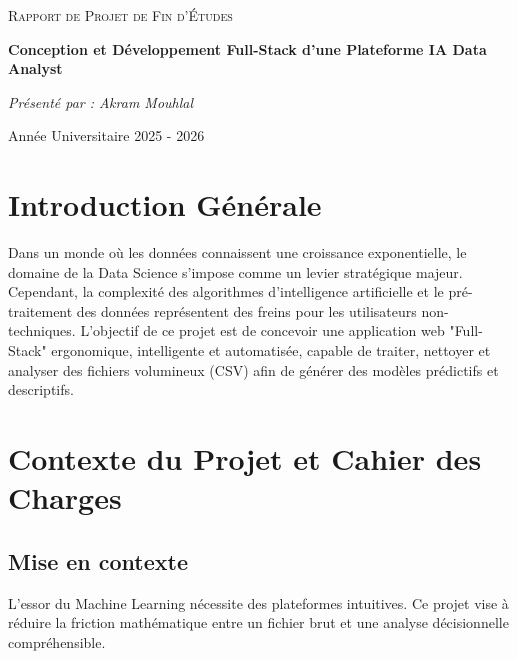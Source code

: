 \documentclass[12pt, a4paper]{report}
\begin{document}
\begin{titlepage}
    \centering
    \vspace*{2cm}
    
    {\scshape\Large Rapport de Projet de Fin d'Études \par}
    \vspace{1.5cm}
    {\huge\bfseries Conception et Développement Full-Stack d'une Plateforme IA Data Analyst\par}
    \vspace{2cm}
    {\Large\itshape Présenté par : Akram Mouhlal\par}
    \vfill
    {\large Année Universitaire 2025 - 2026 \par}
\end{titlepage}

\tableofcontents
\listoffigures
\newpage

\chapter*{Introduction Générale}
Dans un monde où les données connaissent une croissance exponentielle, le domaine de la Data Science s'impose comme un levier stratégique majeur. Cependant, la complexité des algorithmes d'intelligence artificielle et le pré-traitement des données représentent des freins pour les utilisateurs non-techniques. 
L'objectif de ce projet est de concevoir une application web "Full-Stack" ergonomique, intelligente et automatisée, capable de traiter, nettoyer et analyser des fichiers volumineux (CSV) afin de générer des modèles prédictifs et descriptifs.

\lipsum[1-8] %

\chapter{Contexte du Projet et Cahier des Charges}
\section{Mise en contexte}
L'essor du Machine Learning nécessite des plateformes intuitives. Ce projet vise à réduire la friction mathématique entre un fichier brut et une analyse décisionnelle compréhensible.
\lipsum[9-18]
\end{document}
